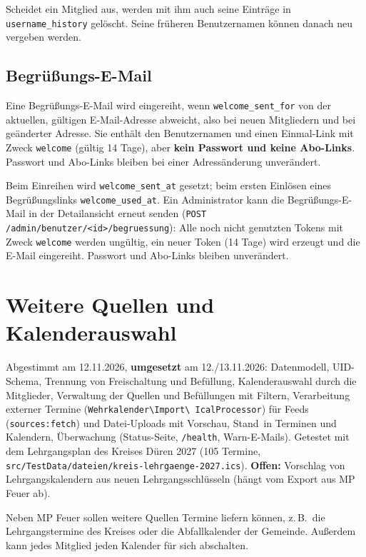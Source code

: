 \documentclass[a4paper,fontsize=10pt]{scrartcl}
\newcommand{\code}[1]{\texttt{#1}}
\begin{document}
Scheidet ein Mitglied aus, werden mit ihm auch seine Einträge in
\code{username\_history} gelöscht. Seine früheren Benutzernamen können
danach neu vergeben werden.

\subsection{Begrüßungs-E-Mail}

Eine Begrüßungs-E-Mail wird eingereiht, wenn \code{welcome\_sent\_for}
von der aktuellen, gültigen E-Mail-Adresse abweicht, also bei neuen
Mitgliedern und bei geänderter Adresse. Sie enthält den Benutzernamen und
einen Einmal-Link mit Zweck \code{welcome} (gültig 14 Tage), aber
\textbf{kein Passwort und keine Abo-Links}. Passwort und Abo-Links bleiben
bei einer Adressänderung unverändert.

Beim Einreihen wird \code{welcome\_sent\_at} gesetzt; beim ersten Einlösen
eines Begrüßungslinks \code{welcome\_used\_at}. Ein Administrator kann die
Begrüßungs-E-Mail in der Detailansicht erneut senden
(\code{POST /admin/benutzer/<id>/begruessung}): Alle noch nicht genutzten
Tokens mit Zweck \code{welcome} werden ungültig, ein neuer Token (14 Tage)
wird erzeugt und die E-Mail eingereiht. Passwort und Abo-Links bleiben
unverändert.

\section{Weitere Quellen und Kalenderauswahl}\label{sec:quellen}

\begin{dshinweis}[title=Stand]
Abgestimmt am 12.11.2026, \textbf{umgesetzt} am 12./13.11.2026: Datenmodell,
UID-Schema, Trennung von Freischaltung und Befüllung, Kalenderauswahl durch
die Mitglieder, Verwaltung der Quellen und Befüllungen mit Filtern,
Verarbeitung externer Termine (\code{Wehrkalender\textbackslash Import\textbackslash
IcalProcessor}) für Feeds (\code{sources:fetch}) und Datei-Uploads mit
Vorschau, \glqq Stand\grqq\ in Terminen und Kalendern, Überwachung (Status-Seite,
\code{/health}, Warn-E-Mails). Getestet mit dem Lehrgangsplan des Kreises
Düren 2027 (105 Termine, \code{src/TestData/dateien/kreis-lehrgaenge-2027.ics}).
\textbf{Offen:} Vorschlag von Lehrgangskalendern aus neuen
Lehrgangsschlüsseln (hängt vom Export aus MP Feuer ab).
\end{dshinweis}

Neben MP Feuer sollen weitere Quellen Termine liefern können, z.\,B.\ die
Lehrgangstermine des Kreises oder die Abfallkalender der Gemeinde. Außerdem
kann jedes Mitglied jeden Kalender für sich abschalten.
\end{document}
